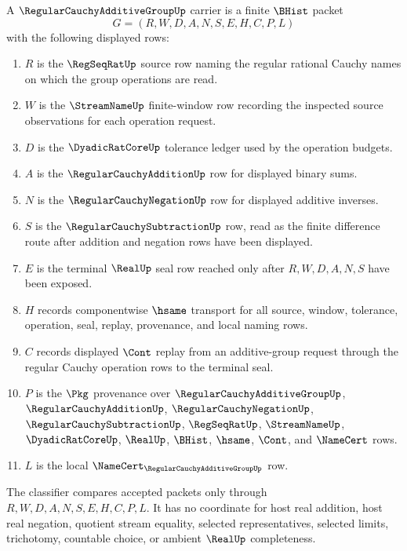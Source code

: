 \begin{definition}
\label{def:regular-cauchy-additive-group-carrier}
A $\RegularCauchyAdditiveGroupUp$ carrier is a finite $\BHist$ packet
$$
G=(R,W,D,A,N,S,E,H,C,P,L)
$$
with the following displayed rows:
\begin{enumerate}
\item $R$ is the $\RegSeqRatUp$ source row naming the regular rational Cauchy names on which the group operations are read.
\item $W$ is the $\StreamNameUp$ finite-window row recording the inspected source observations for each operation request.
\item $D$ is the $\DyadicRatCoreUp$ tolerance ledger used by the operation budgets.
\item $A$ is the $\RegularCauchyAdditionUp$ row for displayed binary sums.
\item $N$ is the $\RegularCauchyNegationUp$ row for displayed additive inverses.
\item $S$ is the $\RegularCauchySubtractionUp$ row, read as the finite difference route after addition and negation rows have been displayed.
\item $E$ is the terminal $\RealUp$ seal row reached only after $R,W,D,A,N,S$ have been exposed.
\item $H$ records componentwise $\hsame$ transport for all source, window, tolerance, operation, seal, replay, provenance, and local naming rows.
\item $C$ records displayed $\Cont$ replay from an additive-group request through the regular Cauchy operation rows to the terminal seal.
\item $P$ is the $\Pkg$ provenance over $\RegularCauchyAdditiveGroupUp$, $\RegularCauchyAdditionUp$, $\RegularCauchyNegationUp$, $\RegularCauchySubtractionUp$, $\RegSeqRatUp$, $\StreamNameUp$, $\DyadicRatCoreUp$, $\RealUp$, $\BHist$, $\hsame$, $\Cont$, and $\NameCert$ rows.
\item $L$ is the local $\NameCert_{\RegularCauchyAdditiveGroupUp}$ row.
\end{enumerate}
The classifier compares accepted packets only through $R,W,D,A,N,S,E,H,C,P,L$. It has no coordinate for host real addition, host real negation, quotient stream equality, selected representatives, selected limits, trichotomy, countable choice, or ambient $\RealUp$ completeness.
\end{definition}

